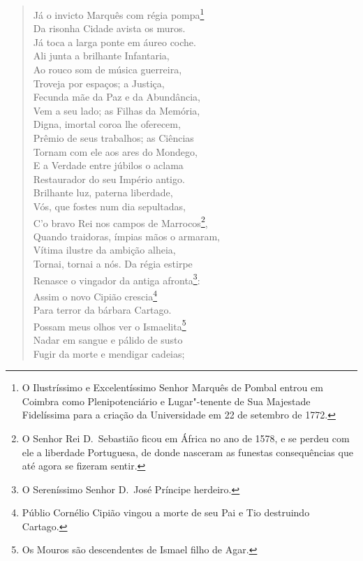 \begin{verse}
Já o invicto Marquês com régia pompa\footnote{ O Ilustríssimo e
Excelentíssimo Senhor Marquês de Pombal entrou em Coimbra como Plenipotenciário		
e Lugar"-tenente de Sua Majestade Fidelíssima para a criação da Universidade em
22 de setembro de 1772.}\\		\index{\Marqpombal}
Da risonha Cidade avista os muros.\\
Já toca a larga ponte em áureo coche.\\
Ali junta a brilhante Infantaria,\\
Ao rouco som de música guerreira,\\
Troveja por espaços; a Justiça,\\
Fecunda mãe da Paz e da Abundância,\\
Vem a seu lado; as Filhas da Memória,\\			\index{\Filmemo}
Digna, imortal coroa lhe oferecem,\\
Prêmio de seus trabalhos; as Ciências\\ 
Tornam com ele aos ares do Mondego,\\		\index{\Monde}
E a Verdade entre júbilos o aclama\\
Restaurador do seu Império antigo.\\	
Brilhante luz, paterna liberdade,\\
Vós, que fostes num dia sepultadas,\\
C'o bravo Rei nos campos de Marrocos\footnote{ O Senhor Rei D.~Sebastião
ficou em África no ano de 1578, e se perdeu com ele a liberdade
Portuguesa, de donde nasceram as funestas consequências que até agora se fizeram
sentir.},\\
Quando traidoras, ímpias mãos o armaram,\\
Vítima ilustre da ambição alheia,\\
Tornai, tornai a nós. Da régia estirpe\\
Renasce o vingador da antiga afronta\footnote{ O Sereníssimo Senhor D.~José
Príncipe herdeiro.}:\\
Assim o novo Cipião crescia\footnote{ Públio Cornélio Cipião vingou a
morte de seu Pai e Tio destruindo Cartago.}\\		\index{\Cipiao}
Para terror da bárbara Cartago.\\
Possam meus olhos ver o Ismaelita\footnote{Os Mouros são descendentes
de Ismael filho de Agar.}\\	\index{\Ismae}
Nadar em sangue e pálido de susto\\
Fugir da morte e mendigar cadeias;\\

\end{verse}
